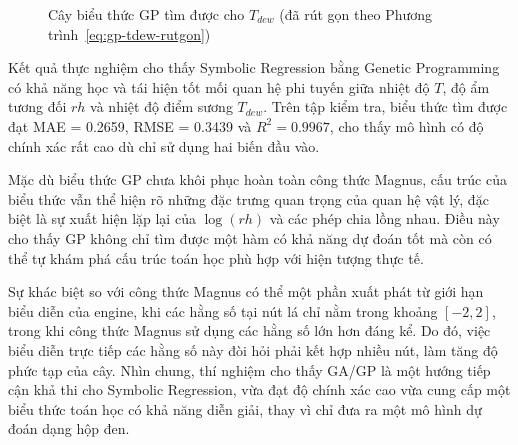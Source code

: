 \begin{figure}[H]
\centering
{}
\caption{Cây biểu thức GP tìm được cho $T_{dew}$ (đã rút gọn theo
Phương trình~\eqref{eq:gp-tdew-rutgon})}
\label{fig:cay-gp-tdew}
\end{figure}

Kết quả thực nghiệm cho thấy Symbolic Regression bằng Genetic
Programming có khả năng học và tái hiện tốt mối quan hệ phi tuyến
giữa nhiệt độ $T$, độ ẩm tương đối $rh$ và nhiệt độ điểm sương
$T_{dew}$. Trên tập kiểm tra, biểu thức tìm được đạt MAE = 0.2659,
RMSE = 0.3439 và $R^2 = 0.9967$, cho thấy mô hình có độ chính xác rất
cao dù chỉ sử dụng hai biến đầu vào.

Mặc dù biểu thức GP chưa khôi phục hoàn toàn công thức Magnus, cấu
trúc của biểu thức vẫn thể hiện rõ những đặc trưng quan trọng của
quan hệ vật lý, đặc biệt là sự xuất hiện lặp lại của $\log(rh)$ và các
phép chia lồng nhau. Điều này cho thấy GP không chỉ tìm được một hàm
có khả năng dự đoán tốt mà còn có thể tự khám phá cấu trúc toán học
phù hợp với hiện tượng thực tế.

Sự khác biệt so với công thức Magnus có thể một phần xuất phát từ
giới hạn biểu diễn của engine, khi các hằng số tại nút lá chỉ nằm
trong khoảng $[-2,2]$, trong khi công thức Magnus sử dụng các hằng số
lớn hơn đáng kể. Do đó, việc biểu diễn trực tiếp các hằng số này đòi
hỏi phải kết hợp nhiều nút, làm tăng độ phức tạp của cây. Nhìn chung,
thí nghiệm cho thấy GA/GP là một hướng tiếp cận khả thi cho Symbolic
Regression, vừa đạt độ chính xác cao vừa cung cấp một biểu thức toán
học có khả năng diễn giải, thay vì chỉ đưa ra một mô hình dự đoán dạng
hộp đen.
